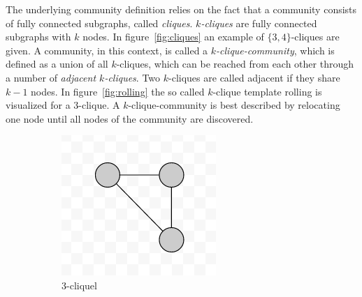 \documentclass[runningheads,a4paper]{llncs}
\begin{document}
The underlying community definition relies on the fact that a community consists of fully connected subgraphs, called \emph{cliques}.
\emph{$k$-cliques} are fully connected subgraphs with $k$ nodes.
In figure~\ref{fig:cliques} an example of $\{3,4\}$-cliques are given.
A community, in this context, is called a \emph{$k$-clique-community}, which is defined as a union of all $k$-cliques, which can be reached from each other through a number of \emph{adjacent $k$-cliques}.
Two $k$-cliques are called adjacent if they share $k-1$ nodes.
In figure~\ref{fig:rolling} the so called $k$-clique template rolling is visualized for a $3$-clique.
A $k$-clique-community is best described by relocating one node until all nodes of the community are discovered.

\begin{figure}
    \centering
    \begin{subfigure}[b]{0.3\textwidth}
        \includegraphics[width=\textwidth]{3-clique}
        \caption{3-cliquel}
        \label{fig:3clique}
    \end{subfigure}
    ~ %
    \begin{subfigure}[b]{0.3\textwidth}

\end{subfigure}
\end{figure}
\end{document}
